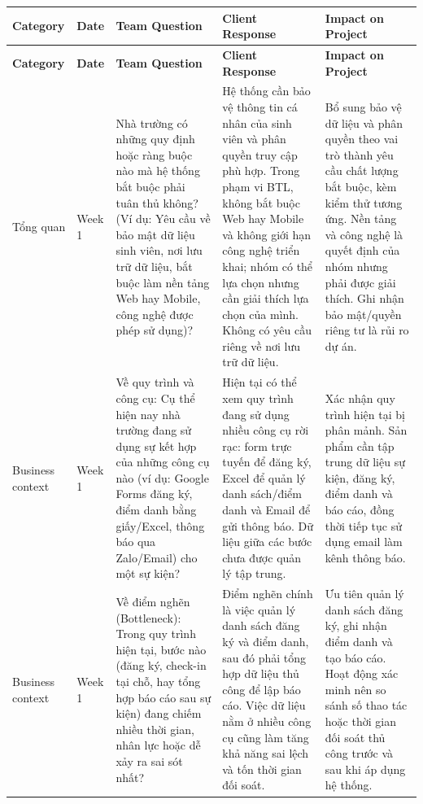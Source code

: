 \begingroup
\setlength{\tabcolsep}{2pt}
\renewcommand{\arraystretch}{1.15}
\scriptsize
\begin{longtable}{>{\RaggedRight\arraybackslash}p{1.70cm}
                  >{\RaggedRight\arraybackslash}p{0.85cm}
                  >{\RaggedRight\arraybackslash}p{3.95cm}
                  >{\RaggedRight\arraybackslash}p{4.20cm}
                  >{\RaggedRight\arraybackslash}p{4.15cm}}
\rowcolor{headerblue}
\color{white}\textbf{Category} &
\color{white}\textbf{Date} &
\color{white}\textbf{Team Question} &
\color{white}\textbf{Client Response} &
\color{white}\textbf{Impact on Project} \\
\endfirsthead
\rowcolor{headerblue}
\color{white}\textbf{Category} &
\color{white}\textbf{Date} &
\color{white}\textbf{Team Question} &
\color{white}\textbf{Client Response} &
\color{white}\textbf{Impact on Project} \\
\endhead

\rowcolor{lightgray}
Tổng quan & Week 1 & Nhà trường có những quy định hoặc ràng buộc nào mà hệ thống bắt buộc phải tuân thủ không? (Ví dụ: Yêu cầu về bảo mật dữ liệu sinh viên, nơi lưu trữ dữ liệu, bắt buộc làm nền tảng Web hay Mobile, công nghệ được phép sử dụng)? & Hệ thống cần bảo vệ thông tin cá nhân của sinh viên và phân quyền truy cập phù hợp. Trong phạm vi BTL, không bắt buộc Web hay Mobile và không giới hạn công nghệ triển khai; nhóm có thể lựa chọn nhưng cần giải thích lựa chọn của mình. Không có yêu cầu riêng về nơi lưu trữ dữ liệu. & Bổ sung bảo vệ dữ liệu và phân quyền theo vai trò thành yêu cầu chất lượng bắt buộc, kèm kiểm thử tương ứng. Nền tảng và công nghệ là quyết định của nhóm nhưng phải được giải thích. Ghi nhận bảo mật/quyền riêng tư là rủi ro dự án. \\

Business context & Week 1 & Về quy trình và công cụ: Cụ thể hiện nay nhà trường đang sử dụng sự kết hợp của những công cụ nào (ví dụ: Google Forms đăng ký, điểm danh bằng giấy/Excel, thông báo qua Zalo/Email) cho một sự kiện? & Hiện tại có thể xem quy trình đang sử dụng nhiều công cụ rời rạc: form trực tuyến để đăng ký, Excel để quản lý danh sách/điểm danh và Email để gửi thông báo. Dữ liệu giữa các bước chưa được quản lý tập trung. & Xác nhận quy trình hiện tại bị phân mảnh. Sản phẩm cần tập trung dữ liệu sự kiện, đăng ký, điểm danh và báo cáo, đồng thời tiếp tục sử dụng email làm kênh thông báo. \\

\rowcolor{lightgray}
Business context & Week 1 & Về điểm nghẽn (Bottleneck): Trong quy trình hiện tại, bước nào (đăng ký, check-in tại chỗ, hay tổng hợp báo cáo sau sự kiện) đang chiếm nhiều thời gian, nhân lực hoặc dễ xảy ra sai sót nhất? & Điểm nghẽn chính là việc quản lý danh sách đăng ký và điểm danh, sau đó phải tổng hợp dữ liệu thủ công để lập báo cáo. Việc dữ liệu nằm ở nhiều công cụ cũng làm tăng khả năng sai lệch và tốn thời gian đối soát. & Ưu tiên quản lý danh sách đăng ký, ghi nhận điểm danh và tạo báo cáo. Hoạt động xác minh nên so sánh số thao tác hoặc thời gian đối soát thủ công trước và sau khi áp dụng hệ thống. \\


\end{longtable}
